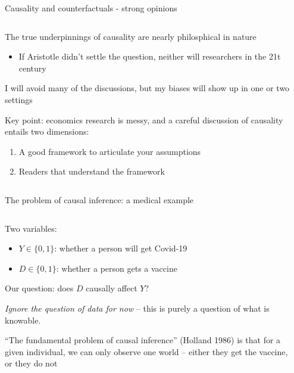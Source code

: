 \documentclass[notes,11pt, aspectratio=169]{beamer}
\newenvironment{wideitemize}{\itemize\addtolength{\itemsep}{10pt}}{\enditemize}
\begin{document}
\begin{frame}{Causality and counterfactuals - strong opinions}
\begin{columns}[T] %
\begin{column}{.65\textwidth}
  \begin{wideitemize}
  \item The true underpinnings of causality are nearly philosphical in nature
    \begin{itemize}
    \item If Aristotle didn't settle the question, neither will
      researchers in the 21t century
    \end{itemize}
  \item I will avoid many of the discussions, but my biases will show up in one or two settings
  \item Key point: economics research is messy, and a careful
    discussion of causality entails two dimensions:
    \begin{enumerate}
    \item A good framework to articulate your assumptions
    \item Readers that understand the framework
    \end{enumerate}
  \end{wideitemize}
\end{column}%
\hfill%
\begin{column}{.38\textwidth}

\end{column}%
\end{columns}
\end{frame}

\begin{frame}{The problem of causal inference: a medical example}
\begin{columns}[T] %
\begin{column}{.8\textwidth}
  \begin{wideitemize}
    \item  Two variables:
    \begin{itemize}
    \item $Y \in \{0, 1\}$: whether a person will get Covid-19
    \item $D \in \{0, 1\}$: whether a person gets a vaccine
    \end{itemize}
  \item Our question: does $D$ causally affect $Y$?
  \item \emph{Ignore the question of data for now} -- this is purely a
    question of what is knowable.
  \item ``The fundamental problem of causal inference'' (Holland 1986)
    is that for a given individual, we can only observe one world --
    either they get the vaccine, or they do not
  \end{wideitemize}
\end{column}%
\hfill%
\begin{column}{.38\textwidth}
\end{column}%
\end{columns}
\end{frame}
\end{document}
